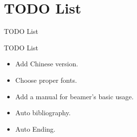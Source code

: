 \section{TODO List}
\begin{frame}{TODO List}
\begin{block}{TODO List}
\begin{itemize}
\item Add Chinese version.
\item Choose proper fonts.
\item Add a manual for beamer's basic usage.
\item Auto bibliography.
\item Auto Ending.
\end{itemize}

\end{block}

\end{frame}

